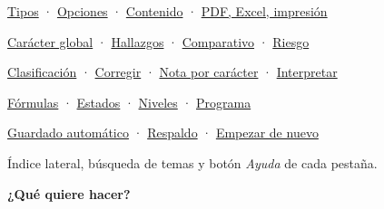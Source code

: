\documentclass[11pt,letterpaper,oneside]{report}
\begin{document}
\begin{tcbraster}
\begin{tcolorbox}[title={\hyperref[cap:informes]{\faFilePdf\ 7. Pestaña 5 · Informes}}]
\hyperref[sec:tiposinf]{Tipos} · \hyperref[sec:opcionesinf]{Opciones} · \hyperref[sec:contenidoinf]{Contenido} · \hyperref[sec:exportar]{PDF, Excel, impresión}
\end{tcolorbox}
\begin{tcolorbox}[title={\hyperref[cap:programa]{\faUniversity\ 8. Pestaña 6 · Programa}}]
\hyperref[sec:dimprog]{Carácter global} · \hyperref[sec:hallazgos]{Hallazgos} · \hyperref[sec:comparativo]{Comparativo} · \hyperref[sec:riesgoprog]{Riesgo}
\end{tcolorbox}
\begin{tcolorbox}[title={\hyperref[cap:caracter]{\faBrain\ 9. Carácter de las competencias}}]
\hyperref[sec:clasificacion]{Clasificación} · \hyperref[sec:corregir]{Corregir} · \hyperref[sec:dimnota]{Nota por carácter} · \hyperref[sec:interpretar]{Interpretar}
\end{tcolorbox}
\begin{tcolorbox}[title={\hyperref[cap:calculos]{\faCalculator\ 10. Cómo se calcula}}]
\hyperref[sec:formulas]{Fórmulas} · \hyperref[sec:estados]{Estados} · \hyperref[sec:niveles]{Niveles} · \hyperref[sec:indprog]{Programa}
\end{tcolorbox}
\begin{tcolorbox}[title={\hyperref[cap:respaldo]{\faSave\ 11. Guardar y respaldos}}]
\hyperref[sec:autoguardado]{Guardado automático} · \hyperref[sec:respaldo]{Respaldo} · \hyperref[sec:nuevo]{Empezar de nuevo}
\end{tcolorbox}
\begin{tcolorbox}[title={\hyperref[cap:manual]{\faBookOpen\ 12. Pestaña 7 · Manual y ayuda}}]
Índice lateral, búsqueda de temas y botón \emph{Ayuda} de cada pestaña.
\end{tcolorbox}
\end{tcbraster}

\textbf{¿Qué quiere hacer?}
\end{document}

